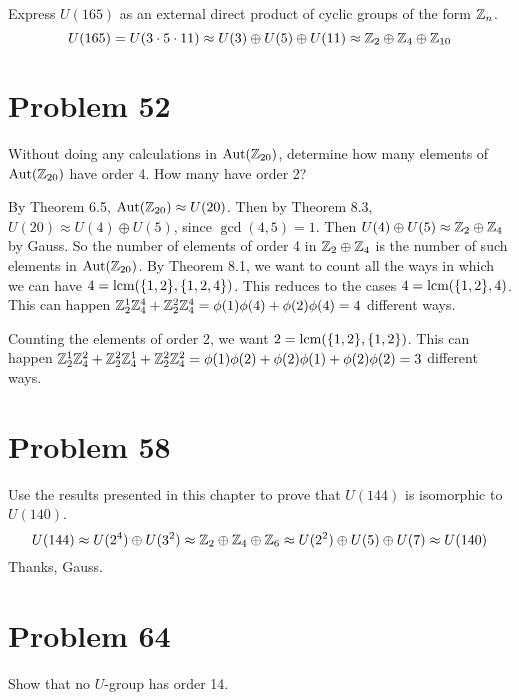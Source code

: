 \documentclass{article}
\begin{document}
Express $U(165)$ as an external direct product of cyclic groups of the form $\mathbb{Z}_n$.
\begin{equation*}
U(165)=U(3\cdot 5\cdot 11)\approx U(3)\oplus U(5)\oplus U(11)\approx\mathbb{Z}_2\oplus\mathbb{Z}_4\oplus\mathbb{Z}_{10}
\end{equation*}

\section*{Problem 52}

Without doing any calculations in $\mbox{Aut}(\mathbb{Z}_{20})$, determine how many elements
of $\mbox{Aut}(\mathbb{Z}_{20})$ have order 4.  How many have order 2?

By Theorem 6.5, $\mbox{Aut}(\mathbb{Z}_{20})\approx U(20)$.
Then by Theorem 8.3, $U(20)\approx U(4)\oplus U(5)$, since $\gcd(4,5)=1$.
Then $U(4)\oplus U(5)\approx\mathbb{Z}_2\oplus\mathbb{Z}_4$ by Gauss.
So the number of elements of order 4 in $\mathbb{Z}_2\oplus\mathbb{Z}_4$ is
the number of such elements in $\mbox{Aut}(\mathbb{Z}_{20})$.
By Theorem 8.1, we want to count all the ways in which we can
have $4=\mbox{lcm}(\{1,2\},\{1,2,4\})$.  This reduces to the cases
$4=\mbox{lcm}(\{1,2\},4)$.  This can happen $\mathbb{Z}_2^1\mathbb{Z}_4^4+\mathbb{Z}_2^2\mathbb{Z}_4^4=
\phi(1)\phi(4)+\phi(2)\phi(4)=4$ different ways.

Counting the elements of order 2, we want $2=\mbox{lcm}(\{1,2\},\{1,2\})$.
This can happen
$\mathbb{Z}_2^1\mathbb{Z}_4^2+\mathbb{Z}_2^2\mathbb{Z}_4^1+\mathbb{Z}_2^2\mathbb{Z}_4^2=\phi(1)\phi(2)+\phi(2)\phi(1)+\phi(2)\phi(2)=3$
different ways.

\section*{Problem 58}

Use the results presented in this chapter to prove that $U(144)$ is
isomorphic to $U(140)$.
\begin{equation*}
U(144)\approx U(2^4)\oplus U(3^2)\approx
\mathbb{Z}_2\oplus\mathbb{Z}_4\oplus\mathbb{Z}_6\approx
U(2^2)\oplus U(5)\oplus U(7)\approx U(140)
\end{equation*}
Thanks, Gauss.

\section*{Problem 64}

Show that no $U$-group has order 14.
\end{document}
